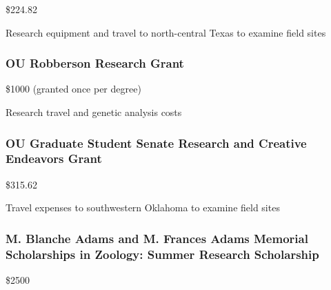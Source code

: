 \documentclass[
  letterpaper,
  DIV=11,
  numbers=noendperiod,
  oneside]{scrreprt}
\begin{document}
\$224.82


Research equipment and travel to north-central Texas to examine field
sites

\subsubsection{OU Robberson Research
Grant}\label{ou-robberson-research-grant}

\$1000 (granted once per degree)


Research travel and genetic analysis costs

\subsubsection{OU Graduate Student Senate Research and Creative
Endeavors
Grant}\label{ou-graduate-student-senate-research-and-creative-endeavors-grant-1}

\$315.62


Travel expenses to southwestern Oklahoma to examine field sites

\subsubsection{M. Blanche Adams and M. Frances Adams Memorial
Scholarships in Zoology: Summer Research
Scholarship}\label{m.-blanche-adams-and-m.-frances-adams-memorial-scholarships-in-zoology-summer-research-scholarship-3}

\$2500

\end{document}
